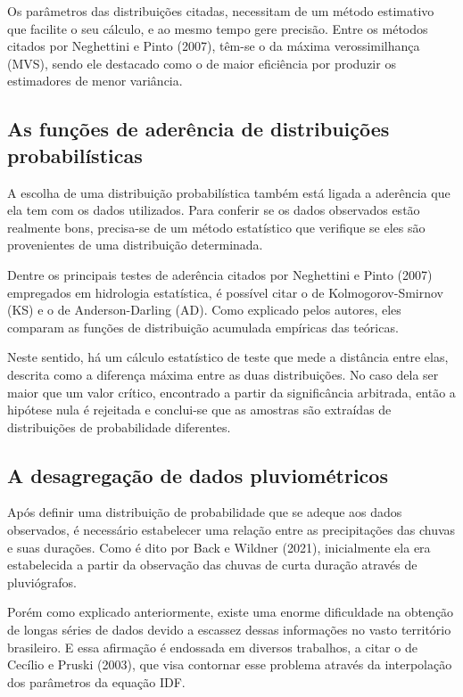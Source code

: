 Os parâmetros das distribuições citadas, necessitam de um método estimativo que facilite o seu cálculo, e ao mesmo tempo gere precisão. Entre os métodos citados por Neghettini e Pinto (2007), têm-se o da máxima verossimilhança (MVS), sendo ele destacado como o de maior eficiência por produzir os estimadores de menor variância.

\subsection{As funções de aderência de distribuições probabilísticas}

A escolha de uma distribuição probabilística também está ligada a aderência que ela tem com os dados utilizados. Para conferir se os dados observados estão realmente bons, precisa-se de um método estatístico que verifique se eles são provenientes de uma distribuição determinada. 

Dentre os principais testes de aderência citados por Neghettini e Pinto (2007) empregados em hidrologia estatística, é possível citar o de Kolmogorov-Smirnov (KS) e o de Anderson-Darling (AD). Como explicado pelos autores, eles comparam as funções de distribuição acumulada empíricas das teóricas.

Neste sentido, há um cálculo estatístico de teste que mede a distância entre elas, descrita como a diferença máxima entre as duas distribuições. No caso dela ser maior que um valor crítico, encontrado a partir da significância arbitrada, então a hipótese nula é rejeitada e conclui-se que as amostras são extraídas de distribuições de probabilidade diferentes.

\subsection{A desagregação de dados pluviométricos}

Após definir uma distribuição de probabilidade que se adeque aos dados observados, é necessário estabelecer uma relação entre as precipitações das chuvas e suas durações. Como é dito por Back e Wildner (2021), inicialmente ela era estabelecida a partir da observação das chuvas de curta duração através de pluviógrafos.

Porém como explicado anteriormente, existe uma enorme dificuldade na obtenção de longas séries de dados devido a escassez dessas informações no vasto território brasileiro. E essa afirmação é endossada em diversos trabalhos, a citar o de Cecílio e Pruski (2003), que visa contornar esse problema através da interpolação dos parâmetros da equação IDF.

